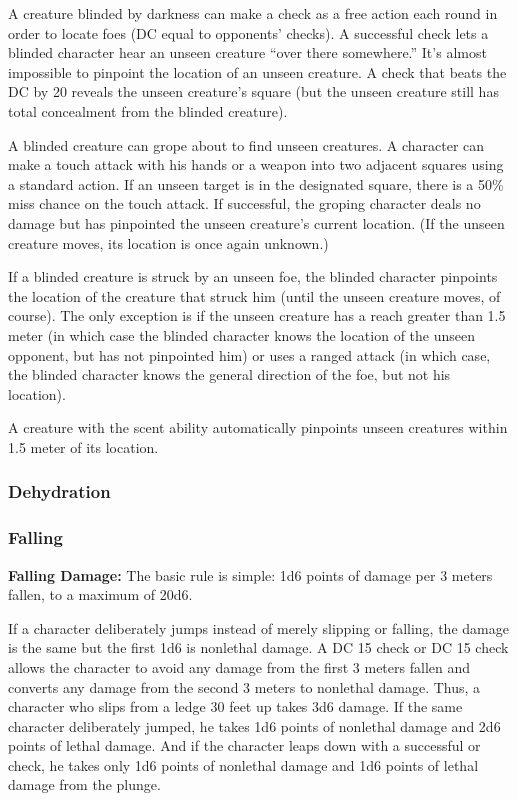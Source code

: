 A creature blinded by darkness can make a  check as a free action each round in order to locate foes (DC equal to opponents'  checks). A successful check lets a blinded character hear an unseen creature ``over there somewhere.'' It's almost impossible to pinpoint the location of an unseen creature. A  check that beats the DC by 20 reveals the unseen creature's square (but the unseen creature still has total concealment from the blinded creature).
\begin{itemize*}
\item A blinded creature can grope about to find unseen creatures. A character can make a touch attack with his hands or a weapon into two adjacent squares using a standard action. If an unseen target is in the designated square, there is a 50\% miss chance on the touch attack. If successful, the groping character deals no damage but has pinpointed the unseen creature's current location. (If the unseen creature moves, its location is once again unknown.)
\item If a blinded creature is struck by an unseen foe, the blinded character pinpoints the location of the creature that struck him (until the unseen creature moves, of course). The only exception is if the unseen creature has a reach greater than 1.5 meter (in which case the blinded character knows the location of the unseen opponent, but has not pinpointed him) or uses a ranged attack (in which case, the blinded character knows the general direction of the foe, but not his location).
\item A creature with the scent ability automatically pinpoints unseen creatures within 1.5 meter of its location.
\end{itemize*}

\subsubsection{Dehydration}
\subsubsection{Falling}
\textbf{Falling Damage:} The basic rule is simple: 1d6 points of damage per 3 meters fallen, to a maximum of 20d6.

If a character deliberately jumps instead of merely slipping or falling, the damage is the same but the first 1d6 is nonlethal damage. A DC 15  check or DC 15  check allows the character to avoid any damage from the first 3 meters fallen and converts any damage from the second 3 meters to nonlethal damage. Thus, a character who slips from a ledge 30 feet up takes 3d6 damage. If the same character deliberately jumped, he takes 1d6 points of nonlethal damage and 2d6 points of lethal damage. And if the character leaps down with a successful  or  check, he takes only 1d6 points of nonlethal damage and 1d6 points of lethal damage from the plunge.

